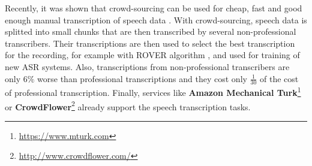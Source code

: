 Recently, it was shown that crowd-sourcing can be used for cheap, fast and good enough manual transcription of speech data \cite{novotney2010cheap}.
With crowd-sourcing, speech data is splitted into small chunks that are then transcribed by several non-professional transcribers.
Their transcriptions are then used to select the best transcription for the recording, for example with ROVER algorithm \cite{marge2010using}, and used for training of new ASR systems.
Also, transcriptions from non-professional transcribers are only $6\%$ worse than professional transcriptions
  and they cost only $\frac{1}{30}$ of the cost of professional transcription.
Finally, services like \textbf{Amazon Mechanical Turk}\footnote{\url{https://www.mturk.com}}
  or \textbf{CrowdFlower}\footnote{\url{http://www.crowdflower.com/}} already support the speech transcription tasks.
